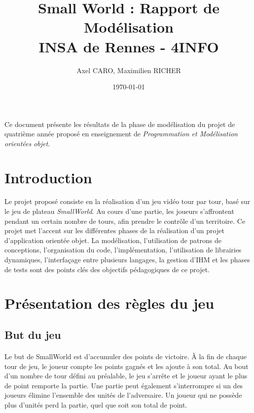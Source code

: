 \documentclass[a4paper]{article}
\title{Small World : Rapport de Modélisation \\ INSA de Rennes - 4INFO}
\author{Axel CARO, Maximilien RICHER}
\date{\today}
\begin{document}
\maketitle

\paragraph{}
Ce document présente les résultats de la phase de modélisation du projet de quatrième année proposé en enseignement de \textit{Programmation et Modélisation orientées objet}.

\newpage

\section*{Introduction}
\paragraph{}
Le projet proposé consiste en la réalisation d'un jeu vidéo tour par tour, basé sur le jeu de plateau \textit{SmallWorld}. Au cours d'une partie, les joueurs s'affrontent pendant un certain nombre de tours, afin prendre le contrôle d'un territoire. Ce projet met l'accent sur les différentes phases de la réalisation d'un projet d'application orientée objet. La modélisation, l'utilisation de patrons de conceptions, l'organisation du code, l'implémentation, l'utilisation de librairies dynamiques, l'interfaçage entre plusieurs langages, la gestion d'IHM et les phases de tests sont des points clés des objectifs pédagogiques de ce projet.

\section{Présentation des règles du jeu}

\subsection{But du jeu}
\paragraph{}
Le but de SmallWorld est d'accumuler des points de victoire.
À la fin de chaque tour de jeu, le joueur compte les points gagnés et les ajoute à son total. Au bout d'un nombre de tour défini au préalable, le jeu s'arrête et le joueur ayant le plus de point remporte la partie. Une partie peut également s'interrompre si un des joueurs élimine l'ensemble des unités de l'adversaire. Un joueur qui ne possède plus d'unités perd la partie, quel que soit son total de point.
\end{document}
